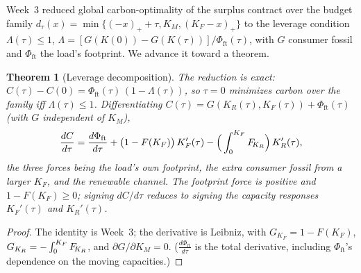 \documentclass[11pt,reqno]{amsart}
\theoremstyle{plain}
\newtheorem{theorem}{Theorem}
\theoremstyle{definition}
\theoremstyle{remark}
\theoremstyle{remark}\newtheorem{observation}{Observation}
\newcommand{\KR}{K_R}\newcommand{\KF}{K_F}\newcommand{\KM}{K_M}
\begin{document}
Week~3 reduced global carbon-optimality of the surplus contract over the budget family
$d_\tau(x)=\min\{(-x)_++\tau,\KM,(\KF-x)_+\}$ to the leverage condition $\Lambda(\tau)\le1$,
$\Lambda=[G(K(0))-G(K(\tau))]/\Phi_{\mathrm{ft}}(\tau)$, with $G$ consumer fossil and
$\Phi_{\mathrm{ft}}$ the load's footprint. We advance it toward a theorem.

\begin{theorem}[Leverage decomposition]\label{thm:leverage}
The reduction is exact: $C(\tau)-C(0)=\Phi_{\mathrm{ft}}(\tau)\,(1-\Lambda(\tau))$, so
$\tau=0$ minimizes carbon over the family iff $\Lambda(\tau)\le1$. Differentiating
$C(\tau)=G(\KR(\tau),\KF(\tau))+\Phi_{\mathrm{ft}}(\tau)$ (with $G$ independent of $\KM$),
\[
  \frac{dC}{d\tau}=\frac{d\Phi_{\mathrm{ft}}}{d\tau}
  +\big(1-F(\KF)\big)\,\KF'(\tau)-\Big(\int_0^{\KF}\FKR\Big)\,\KR'(\tau),
\]
the three forces being the load's own footprint, the extra consumer fossil from a larger
$\KF$, and the renewable channel. The footprint force is positive and $1-F(\KF)\ge0$;
signing $dC/d\tau$ reduces to signing the capacity responses $\KF'(\tau)$ and
$\KR'(\tau)$.
\end{theorem}
\begin{proof}
The identity is Week~3; the derivative is Leibniz, with $G_{\KF}=1-F(\KF)$,
$G_{\KR}=-\int_0^{\KF}\FKR$, and $\partial G/\partial\KM=0$. ($\tfrac{d\Phi_{\mathrm{ft}}}{d\tau}$
is the total derivative, including $\Phi_{\mathrm{ft}}$'s dependence on the moving
capacities.)
\end{proof}
\end{document}
